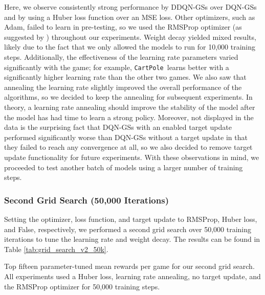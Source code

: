 \documentclass[11pt]{article}
\newcommand{\cp}{\texttt{CartPole}}
\begin{document}
Here, we observe consistently strong performance by DDQN-GSs over DQN-GSs and by using a Huber loss function over an MSE loss. Other optimizers, such as Adam, failed to learn in pre-testing, so we used the RMSProp optimizer (as suggested by \cite{mnih2013playing}) throughout our experiments. Weight decay yielded mixed results, likely due to the fact that we only allowed the models to run for 10,000 training steps. Additionally, the effectiveness of the learning rate parameters varied significantly with the game; for example, \cp~learns better with a significantly higher learning rate than the other two games. We also saw that annealing the learning rate slightly improved the overall performance of the algorithms, so we decided to keep the annealing for subsequent experiments. In theory, a learning rate annealing should improve the stability of the model after the model has had time to learn a strong policy. Moreover, not displayed in the data is the surprising fact that DQN-GSs with an enabled target update performed significantly worse than DQN-GSs without a target update in that they failed to reach any convergence at all, so we also decided to remove target update functionality for future experiments. With these observations in mind, we proceeded to test another batch of models using a larger number of training steps. 

\subsubsection{Second Grid Search (50,000 Iterations)}
 
Setting the optimizer, loss function, and target update to RMSProp, Huber loss, and False, respectively, we performed a second grid search over 50,000 training iterations to tune the learning rate and weight decay. The results can be found in Table \ref{tab:grid_search_v2_50k}.

\begin{table}[!ht]
    \footnotesize
    \centering
    
    
    \caption{Top fifteen parameter-tuned mean rewards per game for our second grid search. All experiments used a Huber loss, learning rate annealing, no target update, and the RMSProp optimizer for 50,000 training steps.}
    \label{tab:grid_search_v2_50k}
\end{table}
\end{document}

